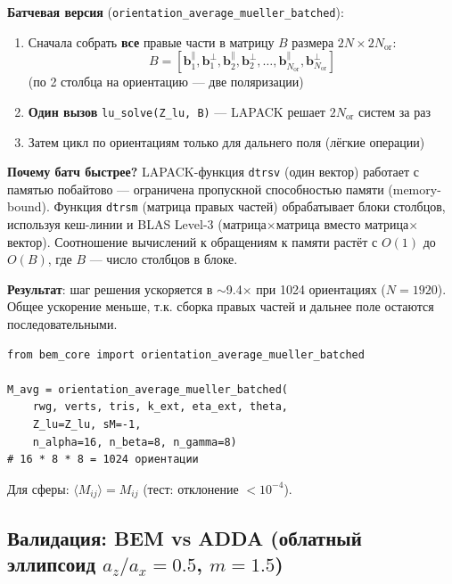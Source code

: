 \documentclass[12pt,a4paper]{article}
\begin{document}
\textbf{Батчевая версия} (\texttt{orientation\_average\_mueller\_batched}):
\begin{enumerate}
  \item Сначала собрать \textbf{все} правые части в матрицу $B$ размера $2N \times 2 N_{\mathrm{or}}$:
  \begin{equation}
    B = [\mathbf{b}_1^{\parallel}, \mathbf{b}_1^{\perp}, \mathbf{b}_2^{\parallel}, \mathbf{b}_2^{\perp}, \ldots, \mathbf{b}_{N_{\mathrm{or}}}^{\parallel}, \mathbf{b}_{N_{\mathrm{or}}}^{\perp}]
  \end{equation}
  (по 2 столбца на ориентацию --- две поляризации)
  \item \textbf{Один вызов} \texttt{lu\_solve(Z\_lu, B)} --- LAPACK решает $2 N_{\mathrm{or}}$ систем за раз
  \item Затем цикл по ориентациям только для дальнего поля (лёгкие операции)
\end{enumerate}

\textbf{Почему батч быстрее?} LAPACK-функция \texttt{dtrsv} (один вектор) работает с памятью побайтово --- ограничена пропускной способностью памяти (memory-bound). Функция \texttt{dtrsm} (матрица правых частей) обрабатывает блоки столбцов, используя кеш-линии и BLAS Level-3 (матрица$\times$матрица вместо матрица$\times$вектор). Соотношение вычислений к обращениям к памяти растёт с $O(1)$ до $O(B)$, где $B$ --- число столбцов в блоке.

\textbf{Результат}: шаг решения ускоряется в $\sim$9.4$\times$ при 1024 ориентациях ($N = 1920$). Общее ускорение меньше, т.к. сборка правых частей и дальнее поле остаются последовательными.

\begin{lstlisting}
from bem_core import orientation_average_mueller_batched

M_avg = orientation_average_mueller_batched(
    rwg, verts, tris, k_ext, eta_ext, theta,
    Z_lu=Z_lu, sM=-1,
    n_alpha=16, n_beta=8, n_gamma=8)
# 16 * 8 * 8 = 1024 ориентации
\end{lstlisting}

Для сферы: $\langle M_{ij} \rangle = M_{ij}$ (тест: отклонение $< 10^{-4}$).

\subsection{Валидация: BEM vs ADDA (облатный эллипсоид $a_z/a_x = 0.5$, $m = 1.5$)}
\end{document}
